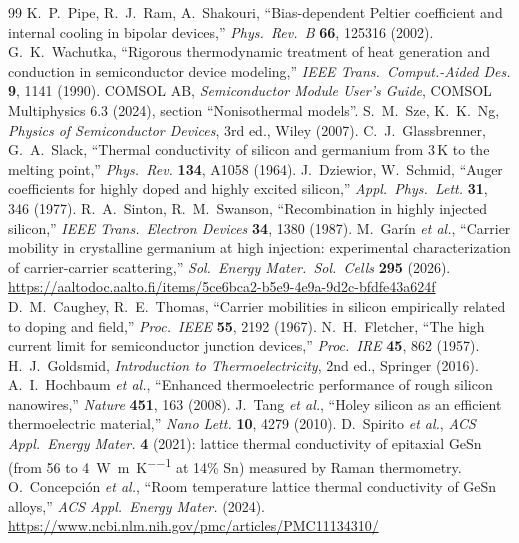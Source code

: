 \documentclass[11pt,a4paper]{article}
\begin{document}
\begin{thebibliography}{99}\small
{} K.~P.~Pipe, R.~J.~Ram, A.~Shakouri, ``Bias-dependent Peltier coefficient and internal cooling in bipolar devices,'' \emph{Phys.\ Rev.\ B} \textbf{66}, 125316 (2002).
 G.~K.~Wachutka, ``Rigorous thermodynamic treatment of heat generation and conduction in semiconductor device modeling,'' \emph{IEEE Trans.\ Comput.-Aided Des.} \textbf{9}, 1141 (1990).
 COMSOL AB, \emph{Semiconductor Module User's Guide}, COMSOL Multiphysics 6.3 (2024), section ``Nonisothermal models''.
 S.~M.~Sze, K.~K.~Ng, \emph{Physics of Semiconductor Devices}, 3rd ed., Wiley (2007).
 C.~J.~Glassbrenner, G.~A.~Slack, ``Thermal conductivity of silicon and germanium from 3\,K to the melting point,'' \emph{Phys.\ Rev.} \textbf{134}, A1058 (1964).
 J.~Dziewior, W.~Schmid, ``Auger coefficients for highly doped and highly excited silicon,'' \emph{Appl.\ Phys.\ Lett.} \textbf{31}, 346 (1977).
 R.~A.~Sinton, R.~M.~Swanson, ``Recombination in highly injected silicon,'' \emph{IEEE Trans.\ Electron Devices} \textbf{34}, 1380 (1987).
 M.~Gar\'in \emph{et al.}, ``Carrier mobility in crystalline germanium at high injection: experimental characterization of carrier-carrier scattering,'' \emph{Sol.\ Energy Mater.\ Sol.\ Cells} \textbf{295} (2026). \url{https://aaltodoc.aalto.fi/items/5ce6bca2-b5e9-4e9a-9d2c-bfdfe43a624f}
 D.~M.~Caughey, R.~E.~Thomas, ``Carrier mobilities in silicon empirically related to doping and field,'' \emph{Proc.\ IEEE} \textbf{55}, 2192 (1967).
 N.~H.~Fletcher, ``The high current limit for semiconductor junction devices,'' \emph{Proc.\ IRE} \textbf{45}, 862 (1957).
 H.~J.~Goldsmid, \emph{Introduction to Thermoelectricity}, 2nd ed., Springer (2016).
 A.~I.~Hochbaum \emph{et al.}, ``Enhanced thermoelectric performance of rough silicon nanowires,'' \emph{Nature} \textbf{451}, 163 (2008).
 J.~Tang \emph{et al.}, ``Holey silicon as an efficient thermoelectric material,'' \emph{Nano Lett.} \textbf{10}, 4279 (2010).
 D.~Spirito \emph{et al.}, \emph{ACS Appl.\ Energy Mater.} \textbf{4} (2021): lattice thermal conductivity of epitaxial GeSn (from 56 to \SI{4}{\watt\per\metre\per\kelvin} at 14\% Sn) measured by Raman thermometry.
 O.~Concepci\'on \emph{et al.}, ``Room temperature lattice thermal conductivity of GeSn alloys,'' \emph{ACS Appl.\ Energy Mater.} (2024). \url{https://www.ncbi.nlm.nih.gov/pmc/articles/PMC11134310/}

\end{thebibliography}
\end{document}
